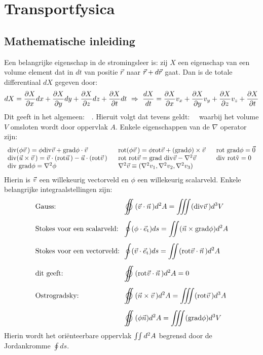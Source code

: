 \chapter{Transportfysica}
\section{Mathematische inleiding}
Een belangrijke eigenschap in de stromingsleer is: zij $X$ een eigenschap
van een volume element dat in $dt$ van positie $\vec{r}$ naar $\vec{r}+d\vec{r}$ gaat.
Dan is de totale differentiaal $dX$ gegeven door:
\[
dX=\frac{\partial X}{\partial x}dx+\frac{\partial X}{\partial y}dy+\frac{\partial X}{\partial z}dz+\frac{\partial X}{\partial t}dt~\Rightarrow~
\frac{dX}{dt}=\frac{\partial X}{\partial x}v_x+\frac{\partial X}{\partial y}v_y+\frac{\partial X}{\partial z}v_z+\frac{\partial X}{\partial t}
\]
Dit geeft in het algemeen:~~.
\npar
Hieruit volgt dat tevens geldt:~~
\npar
waarbij het volume $V$ omsloten wordt door oppervlak $A$.
Enkele eigenschappen van de $\nabla$ operator zijn:
\[
\begin{array}{l@{~~~~~}l@{~~~~~}l}
{\rm div}(\phi\vv\,)=\phi{\rm div}\vv+{\rm grad}\phi\cdot\vv&
{\rm rot}(\phi\vv\,)=\phi{\rm rot}\vv+({\rm grad}\phi)\times\vv&{\rm rot~grad}\phi=\vec{0}\\
{\rm div}(\vec{u}\times\vv\,)=\vv\cdot({\rm rot}\vvec{u})-\vec{u}\cdot({\rm rot}\vv\,)&
{\rm rot~rot}\vv={\rm grad~div}\vv-\nabla^2\vv&{\rm div~rot\vv}=0\\
{\rm div~grad}\phi=\nabla^2\phi&\nabla^2\vv\equiv(\nabla^2v_1,\nabla^2v_2,\nabla^2v_3)
\end{array}
\]
Hierin  is $\vec{v}$ een willekeurig vectorveld en $\phi$ een willekeurig
scalarveld. Enkele belangrijke integraalstellingen zijn:
\[
\begin{array}{l@{~~}l}
\mbox{Gauss:}&\displaystyle\oiint(\vv\cdot\vvec{n})d^2A=\iiint({\rm div}\vv\,)d^3V\\[5mm]
\mbox{Stokes voor een scalarveld:}&\displaystyle\oint(\phi\cdot\e{t})ds=\iint(\vec{n}\times{\rm grad}\phi)d^2A\\[5mm]
\mbox{Stokes voor een vectorveld:}&\displaystyle\oint(\vv\cdot\e{t})ds=\iint({\rm rot}\vv\cdot\vvec{n})d^2A\\[5mm]
\mbox{dit geeft:}&\displaystyle\oiint({\rm rot}\vv\cdot\vvec{n})d^2A=0\\[5mm]
\mbox{Ostrogradsky:}&\displaystyle\oiint(\vec{n}\times\vv\,)d^2A=\iiint({\rm rot}\vv\,)d^3A\\[5mm]
\mbox{}&\displaystyle\oiint(\phi\vec{n})d^2A=\iiint({\rm grad}\phi)d^3V
\end{array}
\]
Hierin wordt het ori\"enteerbare oppervlak $\int\hspace{-1mm}\int d^2A$
begrensd door de Jordankromme $\oint ds$.

